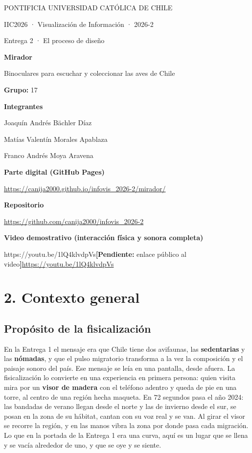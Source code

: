 \documentclass[11pt,a4paper]{article}
\newcommand{\NumeroGrupo}{17}
\newcommand{\VideoFinal}{https://youtu.be/1lQ4klvdpVs}
\newcommand{\pend}[1]{\textcolor{pendiente}{\textbf{[Pendiente:} #1\textbf{]}}}
\begin{document}
\begin{titlepage}
{\small PONTIFICIA UNIVERSIDAD CATÓLICA DE CHILE\par
IIC2026 · Visualización de Información · 2026-2\par}
\vspace{24mm}
{\Large Entrega 2 · El proceso de diseño\par}
\vspace{5mm}
{\Huge\bfseries\color{acento} Mirador\par}
\vspace{6mm}
{\Large Binoculares para escuchar y coleccionar las aves de Chile\par}
\vspace{22mm}
\textbf{Grupo:} \NumeroGrupo\par
\textbf{Integrantes}\par
Joaquín Andrés Bächler Díaz\par
Matías Valentín Morales Apablaza\par
Franco Andrés Moya Aravena\par
\vspace{10mm}
\textbf{Parte digital (GitHub Pages)}\par
\url{https://canija2000.github.io/infovis_2026-2/mirador/}\par
\textbf{Repositorio}\par
\url{https://github.com/canija2000/infovis_2026-2}\par
\textbf{Video demostrativo (interacción física y sonora completa)}\par
\ifx\VideoFinal\empty\pend{enlace público al video}\else\url{\VideoFinal}\fi\par
\vfill
\end{titlepage}

\section*{2. Contexto general}
\subsection*{Propósito de la fisicalización}
En la Entrega 1 el mensaje era que Chile tiene dos avifaunas, las \textbf{sedentarias} y las \textbf{nómadas}, y que el pulso migratorio transforma a la vez la composición y el paisaje sonoro del país. Ese mensaje se leía en una pantalla, desde afuera. La fisicalización lo convierte en una experiencia en primera persona: quien visita mira por un \textbf{visor de madera} con el teléfono adentro y queda de pie en una torre, al centro de una región hecha maqueta. En 72 segundos pasa el año 2024: las bandadas de verano llegan desde el norte y las de invierno desde el sur, se posan en la zona de su hábitat, cantan con su voz real y se van. Al girar el visor se recorre la región, y en las manos vibra la zona por donde pasa cada migración. Lo que en la portada de la Entrega 1 era una curva, aquí es un lugar que se llena y se vacía alrededor de uno, y que se oye y se siente.
\end{document}
